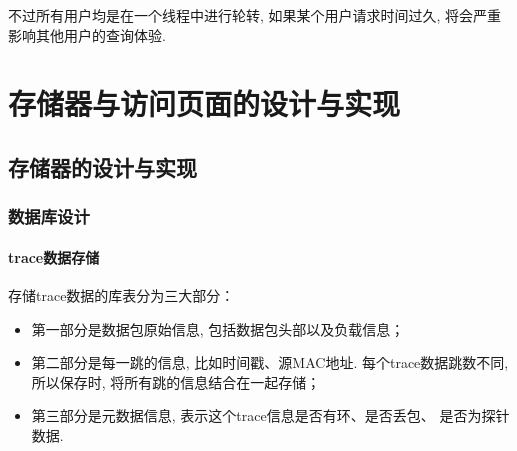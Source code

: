  不过所有用户均是在一个线程中进行轮转, 如果某个用户请求时间过久,
将会严重影响其他用户的查询体验.

\chapter{存储器与访问页面的设计与实现}

\section{存储器的设计与实现}

\subsection{数据库设计}
\label{sec:数据库设计}

\subsubsection{trace数据存储}

存储trace数据的库表分为三大部分：

\begin{itemize}
    \setlength\itemsep{0.1em}
    \item 第一部分是数据包原始信息, 包括数据包头部以及负载信息；
    \item 第二部分是每一跳的信息, 比如时间戳、源MAC地址. 每个trace数据跳数不同,
            所以保存时, 将所有跳的信息结合在一起存储；
    \item 第三部分是元数据信息, 表示这个trace信息是否有环、是否丢包、
            是否为探针数据.
\end{itemize}


